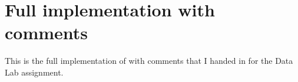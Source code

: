 \section{Full  implementation with comments}

This is the full implementation of  with comments that I handed in for the Data Lab assignment.

